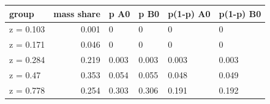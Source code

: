 \begingroup\small
\setlength{\tabcolsep}{3pt}
\renewcommand{\arraystretch}{1.04}
\begin{tabularx}{\linewidth}{XrXXXX}
\toprule
group & mass share & p A0 & p B0 & p(1-p) A0 & p(1-p) B0 \\
\midrule
z = 0.103 & 0.001 & 0 & 0 & 0 & 0 \\
z = 0.171 & 0.046 & 0 & 0 & 0 & 0 \\
z = 0.284 & 0.219 & 0.003 & 0.003 & 0.003 & 0.003 \\
z = 0.47 & 0.353 & 0.054 & 0.055 & 0.048 & 0.049 \\
z = 0.778 & 0.254 & 0.303 & 0.306 & 0.191 & 0.192 \\
\bottomrule
\end{tabularx}
\endgroup
